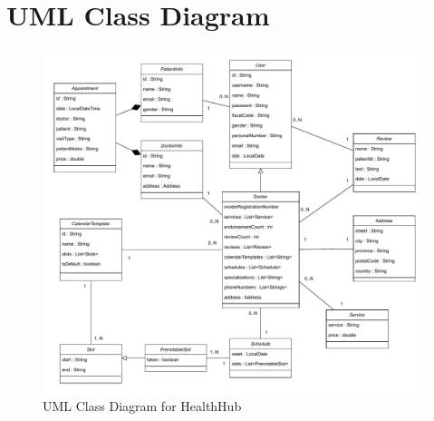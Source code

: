 \section{UML Class Diagram}

\begin{figure}[!h]
    \centering
	\includegraphics[scale=0.69]{./resources/healthhub_UML.pdf}
    \caption{UML Class Diagram for HealthHub}
    \label{fig:uml-diagram}
\end{figure}

